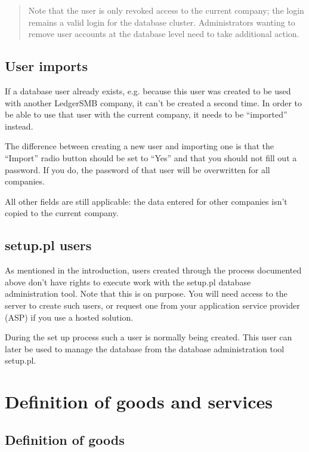 \begin{quotation}
Note that the user is only revoked access to the current company; the login remains a valid
login for the database cluster. Administrators wanting to remove user accounts at the database
level need to take additional action.
\end{quotation}


\section{User imports}
\label{sec-user-imports}

If a database user already exists, e.g. because this user was created to be used
with another LedgerSMB company, it can't be created a second time. In order to be
able to use that user with the current company, it needs to be ``imported'' instead.

The difference between creating a new user and importing one is that the ``Import''
radio button should be set to ``Yes'' and that you should not fill out a password.
If you do, the password of that user will be overwritten for all companies.

All other fields are still applicable: the data entered for other companies isn't
copied to the current company.


\section{setup.pl users}
\label{sec-users-management-initial}

As mentioned in the introduction, users created through the process documented above
don't have rights to execute work with the setup.pl database administration tool.
Note that this
is on purpose. You will need access to the server to create such users, or request
one from your application service provider (ASP) if you use a hosted solution.

During the set up process such a user is normally being created. This user can later
be used to manage the database from the database administration tool setup.pl.


\chapter{Definition of goods and services}
\label{cha-products-definition}


\section{Definition of goods}
\label{sec-products-definition-goods}

